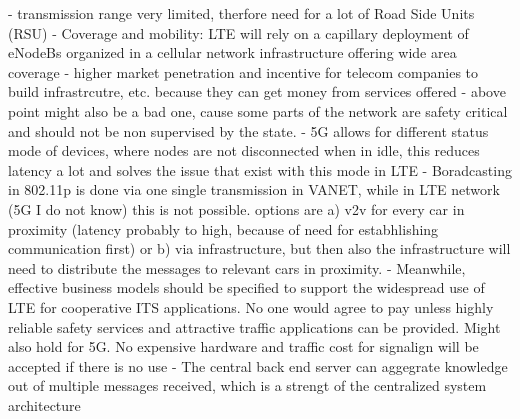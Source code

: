 \documentclass[conference,12pt,onecolumn]{IEEEtran}
\begin{document}
- transmission range very limited, therfore need for a lot of Road Side Units (RSU) \cite{araniti2013}
- Coverage and mobility: LTE will rely on a capillary deployment of eNodeBs organized in a cellular network infrastructure offering wide area coverage \cite{araniti2013}
- higher market penetration and incentive for telecom companies to build infrastrcutre, etc. because they can get money from services offered \cite{lee2016}
- above point might also be a bad one, cause some parts of the network are safety critical and should not be non supervised by the state.
- 5G allows for different status mode of devices, where nodes are not disconnected when in idle, this reduces latency a lot and solves the issue that exist with this mode in LTE \cite{araniti2013}
- Boradcasting in 802.11p is done via one single transmission in VANET, while in LTE network (5G I do not know) this is not possible. options are a) v2v for every car in proximity (latency probably to high, because of need for estabhlishing communication first) or b) via infrastructure, but then also the infrastructure will need to distribute the messages to relevant cars in proximity. \cite{araniti2013}
- Meanwhile, effective business models should be specified to support the widespread use of LTE for cooperative ITS applications. No one would agree to pay unless highly reliable safety services and attractive traffic applications can be provided. \cite{araniti2013} Might also hold for 5G. No expensive hardware and traffic cost for signalign will be accepted if there is no use
- The central back end server can aggegrate knowledge out of multiple messages received, which is a strengt of the centralized system architecture \cite{araniti2013}
\end{document}

